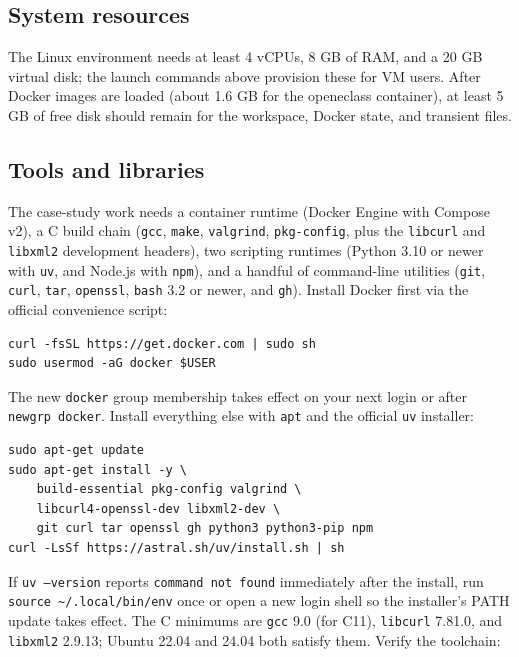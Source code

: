 \documentclass[11pt, a4paper]{article}
\begin{document}
\subsection{System resources}
\label{sec:resources}

The Linux environment needs at least 4 vCPUs, 8 GB of RAM, and a 20 GB virtual disk; the launch commands above provision these for VM users. After Docker images are loaded (about 1.6 GB for the openeclass container), at least 5 GB of free disk should remain for the workspace, Docker state, and transient files.

\subsection{Tools and libraries}
\label{sec:tools}

The case-study work needs a container runtime (Docker Engine with Compose v2), a C build chain (\texttt{gcc}, \texttt{make}, \texttt{valgrind}, \texttt{pkg-config}, plus the \texttt{libcurl} and \texttt{libxml2} development headers), two scripting runtimes (Python 3.10 or newer with \texttt{uv}, and Node.js with \texttt{npm}), and a handful of command-line utilities (\texttt{git}, \texttt{curl}, \texttt{tar}, \texttt{openssl}, \texttt{bash} 3.2 or newer, and \texttt{gh}). Install Docker first via the official convenience script:

\begin{verbatim}
curl -fsSL https://get.docker.com | sudo sh
sudo usermod -aG docker $USER
\end{verbatim}

The new \texttt{docker} group membership takes effect on your next login or after \texttt{newgrp docker}. Install everything else with \texttt{apt} and the official \texttt{uv} installer:

\begin{verbatim}
sudo apt-get update
sudo apt-get install -y \
    build-essential pkg-config valgrind \
    libcurl4-openssl-dev libxml2-dev \
    git curl tar openssl gh python3 python3-pip npm
curl -LsSf https://astral.sh/uv/install.sh | sh
\end{verbatim}

If \texttt{uv --version} reports \texttt{command not found} immediately after the install, run \texttt{source \textasciitilde/.local/bin/env} once or open a new login shell so the installer's PATH update takes effect. The C minimums are \texttt{gcc} 9.0 (for C11), \texttt{libcurl} 7.81.0, and \texttt{libxml2} 2.9.13; Ubuntu 22.04 and 24.04 both satisfy them. Verify the toolchain:
\end{document}
